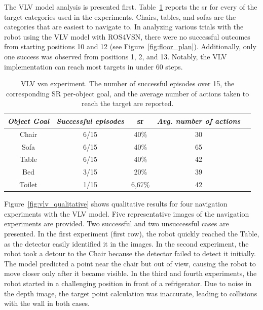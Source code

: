 The VLV model analysis is presented first.
Table~\ref{tab:vlv} reports the \acrshort{sr} for every of the target categories used in the experiments.
Chairs, tables, and sofas are the categories that are easiest to navigate to.
In analyzing various trials with the robot using the VLV model with ROS4VSN, there were no successful outcomes from starting positions 10 and 12 (see Figure~\ref{fig:floor_plan}).
Additionally, only one success was observed from positions 1, 2, and 13.
Notably, the VLV implementation can reach most targets in under 60 steps.

\begin{table}[t]
    \centering
    \begin{tabular}{c|cccc}
        \toprule
        \textit{\textbf{Object Goal}} & \textit{\textbf{Successful episodes}} & \acrshort{sr} & \textit{\textbf{Avg. number of actions}}   \\ \midrule
        Chair                         & 6/15                                  & 40\%          & 30                                       \\
        Sofa                          & 6/15                                  & 40\%          & 65                                       \\
        Table                         & 6/15                                  & 40\%          & 42                                       \\
        Bed                           & 3/15                                  & 20\%          & 39                                       \\
        Toilet                        & 1/15                                  & 6,67\%        & 42                                       \\ \bottomrule
    \end{tabular}
    \caption[VLV \acrshort{vsn} experiment]{VLV \acrshort{vsn} experiment. The number of successful episodes over 15, the corresponding SR per-object goal, and the average number of actions taken to reach the target are reported.}
    \label{tab:vlv}
\end{table}

Figure~\ref{fig:vlv_qualitative} shows qualitative results for four navigation experiments with the VLV model.
Five representative images of the navigation experiments are provided.
Two successful and two unsuccessful cases are presented.
In the first experiment (first row), the robot quickly reached the Table, as the detector easily identified it in the images.
In the second experiment, the robot took a detour to the Chair because the detector failed to detect it initially.
The model predicted a point near the chair but out of view, causing the robot to move closer only after it became visible.
In the third and fourth experiments, the robot started in a challenging position in front of a refrigerator.
Due to noise in the depth image, the target point calculation was inaccurate, leading to collisions with the wall in both cases.

